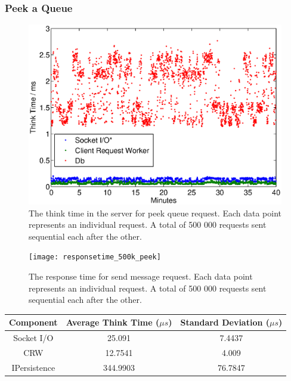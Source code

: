 \documentclass{article}
\begin{document}
        \subsubsection{Peek a Queue}
        
            \begin{figure}[H]
                \hspace{-1.5cm}
                \includegraphics[scale=0.50]{thinktime_500k_peek}
                \caption{The think time in the server for peek queue request. Each data point represents an individual request. A total of 500 000 requests sent sequential each after the other.}
                \label{fig:thinktime_500k_peek}
            \end{figure}
            
            \begin{figure}[H]
                \hspace{-1.5cm}
                \texttt{[image: responsetime\_500k\_peek]}
                \caption{The response time for send message request. Each data point represents an individual request. A total of 500 000 requests sent sequential each after the other.}
                \label{fig:responsetime_500k_peek}
            \end{figure}
                
                \begin{tabular}{|c|c|c|}
                \hline 
            \textbf{Component} & \textbf{Average Think Time} ($\mu s$)  & \textbf{Standard Deviation ($\mu s$)} \\ 
            \hline 
            Socket I/O &25.091 &7.4437\\ 
            \hline 
            CRW &12.7541 &4.009\\ 
            \hline 
            IPersistence &344.9903 &76.7847\\ 
            \hline 
            \end{tabular} 
            
\end{document}
